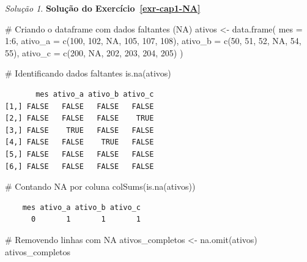 \documentclass[
  portuguese,
  letterpaper,
  DIV=11,
  numbers=noendperiod]{scrreprt}
\newenvironment{Shaded}{\begin{snugshade}}{\end{snugshade}}
\newcommand{\AttributeTok}[1]{\textcolor[rgb]{0.40,0.45,0.13}{#1}}
\newcommand{\CommentTok}[1]{\textcolor[rgb]{0.37,0.37,0.37}{#1}}
\newcommand{\ConstantTok}[1]{\textcolor[rgb]{0.56,0.35,0.01}{#1}}
\newcommand{\DecValTok}[1]{\textcolor[rgb]{0.68,0.00,0.00}{#1}}
\newcommand{\FunctionTok}[1]{\textcolor[rgb]{0.28,0.35,0.67}{#1}}
\newcommand{\NormalTok}[1]{\textcolor[rgb]{0.00,0.23,0.31}{#1}}
\newcommand{\OtherTok}[1]{\textcolor[rgb]{0.00,0.23,0.31}{#1}}
\newcommand{\SpecialCharTok}[1]{\textcolor[rgb]{0.37,0.37,0.37}{#1}}
\theoremstyle{definition}
\theoremstyle{remark}
\newtheorem*{solution}{Solução}
\begin{document}
\begin{solution}
\textbf{Solução do Exercício~\ref{exr-cap1-NA}}

\begin{Shaded}
\begin{Highlighting}[]
\CommentTok{\# Criando o dataframe com dados faltantes (NA)}
\NormalTok{ativos }\OtherTok{\textless{}{-}} \FunctionTok{data.frame}\NormalTok{(}
  \AttributeTok{mes =} \DecValTok{1}\SpecialCharTok{:}\DecValTok{6}\NormalTok{,}
  \AttributeTok{ativo\_a =} \FunctionTok{c}\NormalTok{(}\DecValTok{100}\NormalTok{, }\DecValTok{102}\NormalTok{, }\ConstantTok{NA}\NormalTok{, }\DecValTok{105}\NormalTok{, }\DecValTok{107}\NormalTok{, }\DecValTok{108}\NormalTok{),}
  \AttributeTok{ativo\_b =} \FunctionTok{c}\NormalTok{(}\DecValTok{50}\NormalTok{, }\DecValTok{51}\NormalTok{, }\DecValTok{52}\NormalTok{, }\ConstantTok{NA}\NormalTok{, }\DecValTok{54}\NormalTok{, }\DecValTok{55}\NormalTok{),}
  \AttributeTok{ativo\_c =} \FunctionTok{c}\NormalTok{(}\DecValTok{200}\NormalTok{, }\ConstantTok{NA}\NormalTok{, }\DecValTok{202}\NormalTok{, }\DecValTok{203}\NormalTok{, }\DecValTok{204}\NormalTok{, }\DecValTok{205}\NormalTok{)}
\NormalTok{)}

\CommentTok{\# Identificando dados faltantes}
\FunctionTok{is.na}\NormalTok{(ativos)}
\end{Highlighting}
\end{Shaded}

\begin{verbatim}
       mes ativo_a ativo_b ativo_c
[1,] FALSE   FALSE   FALSE   FALSE
[2,] FALSE   FALSE   FALSE    TRUE
[3,] FALSE    TRUE   FALSE   FALSE
[4,] FALSE   FALSE    TRUE   FALSE
[5,] FALSE   FALSE   FALSE   FALSE
[6,] FALSE   FALSE   FALSE   FALSE
\end{verbatim}

\begin{Shaded}
\begin{Highlighting}[]
\CommentTok{\# Contando NA por coluna}
\FunctionTok{colSums}\NormalTok{(}\FunctionTok{is.na}\NormalTok{(ativos))}
\end{Highlighting}
\end{Shaded}

\begin{verbatim}
    mes ativo_a ativo_b ativo_c 
      0       1       1       1 
\end{verbatim}

\begin{Shaded}
\begin{Highlighting}[]
\CommentTok{\# Removendo linhas com NA}
\NormalTok{ativos\_completos }\OtherTok{\textless{}{-}} \FunctionTok{na.omit}\NormalTok{(ativos)}
\NormalTok{ativos\_completos}
\end{Highlighting}
\end{Shaded}


\end{solution}
\end{document}
